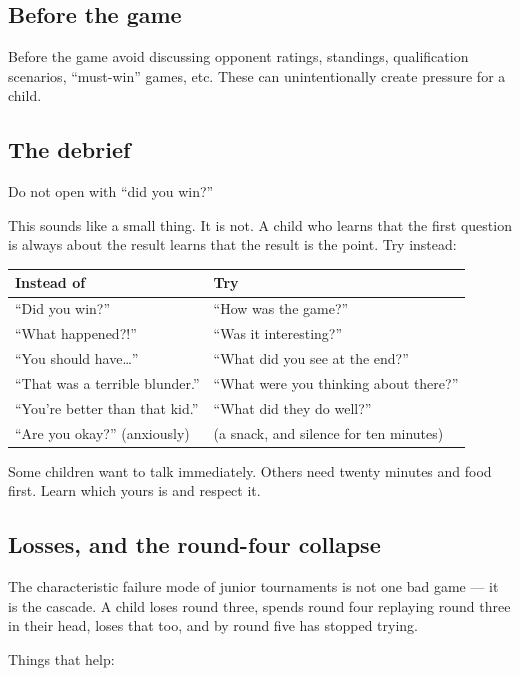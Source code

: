 \documentclass[10pt,letterpaper]{article}
\begin{document}
\subsection{Before the game}
Before the game avoid discussing opponent ratings, standings, qualification scenarios, “must-win” games, etc. These can unintentionally create pressure for a child.

\subsection{The debrief}

Do not open with ``did you win?''

This sounds like a small thing. It is not. A child who learns that the first
question is always about the result learns that the result is the point. Try
instead:

\begin{center}
\begin{tabularx}{\textwidth}{@{}XX@{}}
\toprule
\textbf{Instead of} & \textbf{Try} \\
\midrule
``Did you win?'' & ``How was the game?'' \\
``What happened?!'' & ``Was it interesting?'' \\
``You should have\ldots'' & ``What did you see at the end?'' \\
``That was a terrible blunder.'' & ``What were you thinking about there?'' \\
``You're better than that kid.'' & ``What did they do well?'' \\
``Are you okay?'' (anxiously) & (a snack, and silence for ten minutes) \\
\bottomrule
\end{tabularx}
\end{center}

Some children want to talk immediately. Others need twenty minutes and food
first. Learn which yours is and respect it.

\subsection{Losses, and the round-four collapse}

The characteristic failure mode of junior tournaments is not one bad game --- it
is the cascade. A child loses round three, spends round four replaying round
three in their head, loses that too, and by round five has stopped trying.

Things that help:
\end{document}
